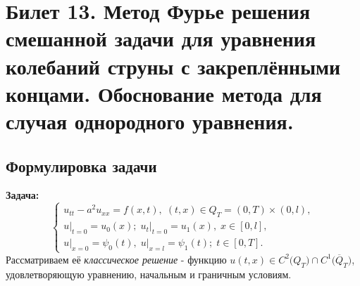 \section{Билет 13. Метод Фурье решения смешанной задачи для уравнения колебаний струны с закреплёнными концами. Обоснование метода для случая однородного уравнения.}
\subsection{Формулировка задачи}
\textbf{Задача:}
\begin{equation}
\label{eq:13_1}
\begin{cases}
	u_{tt} - a^2u_{xx} = f(x, t),\; (t, x) \in Q_{T} = (0, T) \times (0, l), \\
    u\bigr|_{t = 0} = u_{0}(x);\; u_{t}\bigr|_{t =0} = u_{1}(x),\; x \in [0, l], \\
    u\bigr|_{x = 0} = \psi_{0}(t),\; u\bigr|_{x = l} = \psi_{1}(t);\; t \in [0, T].
\end{cases}
\end{equation}
Рассматриваем её \textit{классическое решение} - функцию $u(t, x) \in C^{2}\bigl(Q_{T}\bigr) \cap C^{1}\bigl(\overline{Q}_{T}\bigr)$, удовлетворяющую уравнению, начальным и граничным условиям. \\
